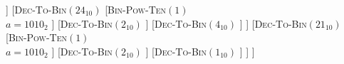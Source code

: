 \documentclass[12pt]{standalone}%
\begin{document}
	\begin{forest}
		[\textsc{Dec-To-Bin}$(2421_{10})$
			[\textsc{Bin-Pow-Ten}$(2)$ \\ {$n=2$}
				[\textsc{Bin-Pow-Ten}$(1)$\\{$a=1010_2$} ]
				[\textsc{Fast-Multiply}(a{,}a)\\{$a=1010_2$}
				]
			]
			[\textsc{Dec-To-Bin}$(24_{10})$
					[\textsc{Bin-Pow-Ten}$(1)$\\{$a=1010_2$}
					]
					[\textsc{Dec-To-Bin}$(2_{10})$
					]
					[\textsc{Dec-To-Bin}$(4_{10})$
					]
			]
			[\textsc{Dec-To-Bin}$(21_{10})$
				[\textsc{Bin-Pow-Ten}$(1)$\\{$a=1010_2$}
				]
				[\textsc{Dec-To-Bin}$(2_{10})$
				]
				[\textsc{Dec-To-Bin}$(1_{10})$
				]
			]
		]
	\end{forest}
\end{document}
